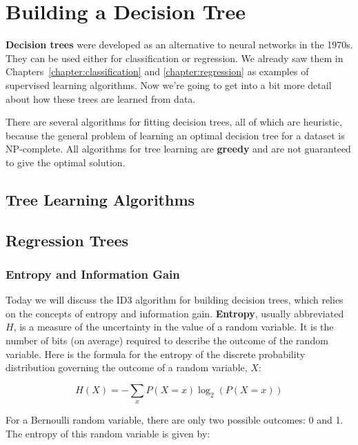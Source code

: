 \chapter{Building a Decision Tree \label{chapter:decisiontrees}}

{\bf Decision trees} were developed as an alternative to neural networks in the 1970s. They can be used either for classification or regression. We already saw them in Chapters~\ref{chapter:classification} and \ref{chapter:regression} as examples of supervised learning algorithms. Now we're going to get into a bit more detail about how these trees are learned from data. 

There are several algorithms for fitting decision trees, all of which are heuristic, because the general problem of learning an optimal decision tree for a dataset is NP-complete. All algorithms for tree learning are \textbf{greedy} and are not guaranteed to give the optimal solution.


\section{Tree Learning Algorithms}

\section{Regression Trees}


\subsection{Entropy and Information Gain}

Today we will discuss the ID3 algorithm for building decision trees, which relies on the concepts of entropy and information gain. \textbf{Entropy}, usually abbreviated $H$, is a measure of the uncertainty in the value of a random variable. It is the number of bits (on average) required to describe the outcome of the random variable. Here is the formula for the entropy of the discrete probability distribution governing the outcome of a random variable, $X$:

$$ H(X) = - \sum_{x} P(X = x) \log_2\left(P(X = x)\right) $$

For a Bernoulli random variable, there are only two possible outcomes: 0 and 1. The entropy of this random variable is given by:

